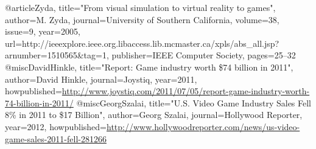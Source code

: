 @article{Zyda,
title="{From visual simulation to virtual reality to games}",
author={M. Zyda},
journal={University of Southern California},
volume={38},
issue={9},
year={2005},
url={http://ieeexplore.ieee.org.libaccess.lib.mcmaster.ca/xpls/abs_all.jsp?arnumber=1510565&tag=1},
publisher={IEEE Computer Society},
pages={25--32}
}
@misc{DavidHinkle,
title="{Report: Game industry worth \$74 billion in 2011}",
author={David Hinkle},
journal={Joystiq},
year={2011},
howpublished={\url{http://www.joystiq.com/2011/07/05/report-game-industry-worth-74-billion-in-2011/}}
}
@misc{GeorgSzalai,
title="{U.S. Video Game Industry Sales Fell 8\% in 2011 to \$17 Billion}",
author={Georg Szalai},
journal={Hollywood Reporter},
year={2012},
howpublished={\url{http://www.hollywoodreporter.com/news/us-video-game-sales-2011-fell-281266}}
}